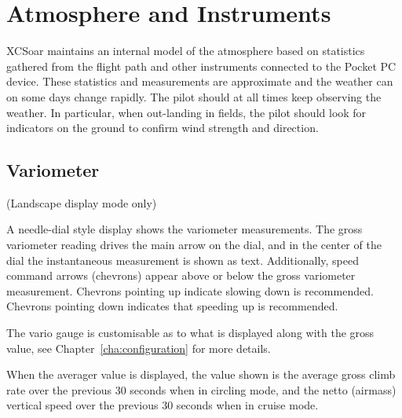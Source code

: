 \documentclass[a4paper,12pt]{refrep}
\begin{document}
\chapter{Atmosphere and Instruments}\label{cha:atmosph}
XCSoar maintains an internal model of the atmosphere based on
statistics gathered from the flight path and other instruments
connected to the Pocket PC device.  These statistics and measurements
are approximate and the weather can on some days change rapidly.  The
pilot should at all times keep observing the weather.  In
particular, when out-landing in fields, the pilot should look for
indicators on the ground to confirm wind strength and direction.

\section{Variometer}

(Landscape display mode only)

A needle-dial style display shows the variometer measurements.  The
gross variometer reading drives the main arrow on the dial, and in the
center of the dial the instantaneous measurement is shown as text.
Additionally, speed command arrows (chevrons) appear above or below
the gross variometer measurement.  Chevrons pointing up indicate
slowing down is recommended.  Chevrons pointing down indicates that
speeding up is recommended.  

The vario gauge is customisable as to what is displayed along with the
gross value, see Chapter~\ref{cha:configuration} for more details.

When the averager value is displayed, the value shown is the average
gross climb rate over the previous 30 seconds when in circling mode,
and the netto (airmass) vertical speed over the previous 30 seconds
when in cruise mode.
\end{document}
